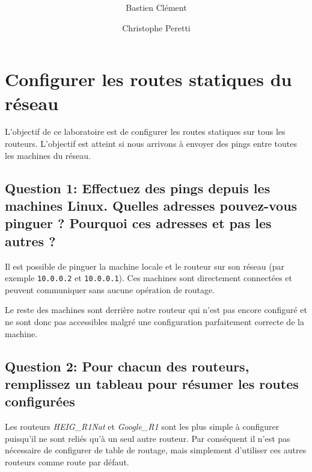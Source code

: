 \documentclass[11pt,a4paper]{article}
\author{Bastien Clément \and Christophe Peretti}
\title{{\normalsize \doccourse} \\ \doctitle }
\begin{document}
\maketitle
\vspace{1em}

\section{Configurer les routes statiques du réseau}

L'objectif de ce laboratoire est de configurer les routes statiques sur tous les routeurs. L'objectif est atteint si nous arrivons à envoyer des pings entre toutes les machines du réseau.

\subsection{Question 1: Effectuez des pings depuis les machines Linux. Quelles adresses pouvez-vous pinguer ? Pourquoi ces adresses et pas les autres ?}

Il est possible de pinguer la machine locale et le routeur sur son réseau (par exemple \texttt{10.0.0.2} et \texttt{10.0.0.1}). Ces machines sont directement connectées et peuvent communiquer sans aucune opération de routage.

Le reste des machines sont derrière notre routeur qui n'est pas encore configuré et ne sont donc pas accessibles malgré une configuration parfaitement correcte de la machine.

\subsection{Question 2: Pour chacun des routeurs, remplissez un tableau pour résumer les routes configurées}

Les routeurs \textit{HEIG\_R1Nat} et \textit{Google\_R1} sont les plus simple à configurer puisqu'il ne sont reliés qu'à un seul autre routeur. Par conséquent il n'est pas nécessaire de configurer de table de routage, mais simplement d'utiliser ces autres routeurs comme route par défaut.

\vspace{0.5cm}
\end{document}
